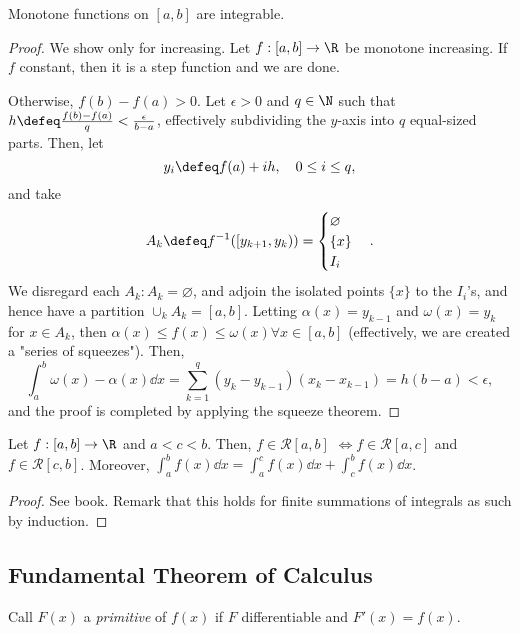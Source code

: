 \begin{theorem}[BS-7.2.7]
    Monotone functions on $[a, b]$ are integrable.
\end{theorem}

\begin{proof}
    We show only for increasing. Let $f: [a, b] \to \R$ be monotone increasing. If $f$ constant, then it is a step function and we are done.

    Otherwise, $f(b) - f(a) > 0$. Let $\epsilon > 0$ and $q \in \N$ such that $h \defeq \frac{f(b)-f(a)}{q} < \frac{\epsilon}{b-a}$, effectively subdividing the $y$-axis into $q$ equal-sized parts. Then, let \[
    y_i \defeq f(a) + i h, \quad 0 \leq i \leq q,    
    \]
    and take $$A_k \defeq f^{-1}([y_{k+1}, y_k)) = \begin{cases}
        \varnothing\\
        \{x\}\\
        I_i
    \end{cases}.$$
    We disregard each $A_k : A_k = \varnothing$, and adjoin the isolated points $\{x\}$ to the $I_i$'s, and hence have a partition $\cup_k A_k = [a, b]$. Letting $\alpha(x) = y_{k-1}$ and $\omega(x) = y_k$ for $x \in A_k$, then $\alpha(x) \leq f(x) \leq \omega(x) \forall x \in [a, b]$ (effectively, we are created a "series of squeezes"). Then, \[
    \int_{a}^b \omega(x) - \alpha(x) \dd{x} = \sum_{k=1}^q (y_k - y_{k-1})(x_k-x_{k-1}) = h (b-a) < \epsilon,
    \]
    and the proof is completed by applying the squeeze theorem.
\end{proof}

\begin{theorem}[Additivity; BS-7.2.8]
    Let $f : [a, b] \to \R$ and $a < c < b$. Then,  $f \in \mathcal{R}[a, b]$ $\iff f \in \mathcal{R}[a, c]$ and $f \in \mathcal{R}[c, b]$. Moreover, $\int_a^b f(x) \dd{x} = \int_a^c f(x) \dd{x} + \int_c^b f(x) \dd{x}$.
\end{theorem}

\begin{proof}
    See book. Remark that this holds for finite summations of integrals as such by induction.
\end{proof}

\subsection{Fundamental Theorem of Calculus}

\begin{definition}
    Call $F(x)$ a \emph{primitive} of $f(x)$ if $F$ differentiable and $F'(x) = f(x)$.
\end{definition}

